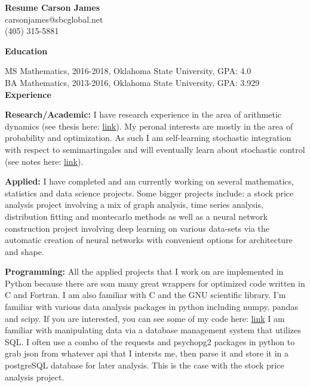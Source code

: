 \documentclass[12pt]{amsart}
\newcommand{\n}{\noindent}
\begin{document}
\textbf{\hspace{7cm}\large Resume \hspace{4cm} \large Carson James}\\ \phantom{1} \hspace{13cm} carsonjames@sbcglobal.net\\ \phantom{1} \hspace{13.9cm} (405) 315-5881


\n\textbf{\large Education} \vspace{2mm}

\n MS Mathematics, 2016-2018, Oklahoma State University, GPA: 4.0\\
\n BA Mathematics, 2013-2016, Oklahoma State University, GPA: 3.929 \vspace{.5mm}\\

 \n \textbf{\large Experience} \vspace{2mm}

\n \textbf{Research/Academic:}
I have research experience in the area of arithmetic dynamics (see thesis here: \textcolor{blue}{ \href{https://github.com/carsonaj/Math/blob/master/Arithmetic\%20Dynamics/Arithmetic\%20Dynamics\%20Notes.pdf}{link}}). My peronal interests are mostly in the area of probability and optimization. As such I am self-learning stochastic integration with respect to semimartingales and will eventually learn about stochastic control (see notes here: \textcolor{blue}{ \href{https://github.com/carsonaj/Math/blob/master/Stochastic\%20Analysis/Stochastic\%20Processes\%20-\%20James.pdf}{link}}). \vspace{2mm}


\n  \textbf{Applied:} I have completed and am currently working on several mathematics, statistics and data science projects. Some bigger projects include: a stock price analysis project involving a mix of graph analysis, time series analysis, distribution fitting and montecarlo methods as well as a neural network construction project involving deep learning on various data-sets via the automatic creation of neural networks with convenient options for architecture and shape. \vspace{2mm}

\n \textbf{Programming:} All the applied projects that I work on are implemented in Python because there are som many great wrappers for optimized code written in C and Fortran. I am also familiar with C and the GNU scientific library. I'm familiar with various data analysis packages in python including numpy, pandas and scipy. If you are interested, you can see some of my code here: \textcolor{blue}{ \href{https://github.com/carsonaj/Programming}{link}} I am familiar with manipulating data via a database management system that utilizes SQL. I often use a combo of the requests and psychopg2 packages in python to grab json from whatever api that I intersts me, then parse it and store it in a postgreSQL database for later analysis. This is the case with the stock price analysis project. \vspace{2mm}
\end{document}
